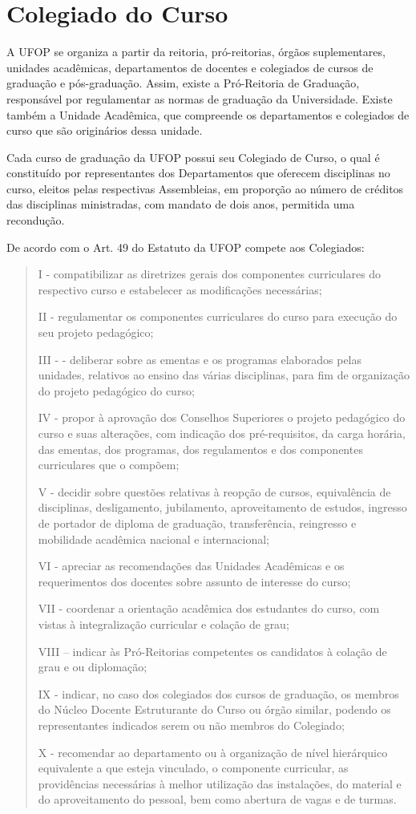 \documentclass[
	12pt,				%
	openright,			%
	oneside,			%
	a4paper,			%
	english,			%
	brazil				%
	]{abntex2}
\begin{document}
\section{Colegiado do Curso}
A UFOP se organiza a partir da reitoria, pró-reitorias, órgãos suplementares, unidades acadêmicas, departamentos de docentes e colegiados de cursos de graduação e pós-graduação. Assim, existe a Pró-Reitoria de Graduação, responsável por regulamentar as normas de graduação da Universidade. Existe também a Unidade Acadêmica, que compreende os departamentos e colegiados de curso que são originários dessa unidade.

Cada curso de graduação da UFOP possui seu Colegiado de Curso, o qual é constituído por representantes dos Departamentos que oferecem disciplinas no curso, eleitos pelas respectivas Assembleias, em proporção ao número de créditos das disciplinas ministradas, com mandato de dois anos, permitida uma recondução.

De acordo com o Art. 49 do Estatuto da UFOP compete aos Colegiados:

\begin{quotation}
I - compatibilizar as diretrizes gerais dos componentes curriculares do respectivo curso e estabelecer as modificações necessárias;

II - regulamentar os componentes curriculares do curso para execução do seu projeto
pedagógico;

III - - deliberar sobre as ementas e os programas elaborados pelas unidades, relativos ao ensino das várias disciplinas, para fim de organização do projeto pedagógico do curso;

IV - propor à aprovação dos Conselhos Superiores o projeto pedagógico do curso e suas
alterações, com indicação dos pré-requisitos, da carga horária, das ementas, dos programas, dos regulamentos e dos componentes curriculares que o compõem;

V - decidir sobre questões relativas à reopção de cursos, equivalência de disciplinas, desligamento, jubilamento, aproveitamento de estudos, ingresso de portador de diploma de graduação, transferência, reingresso e mobilidade acadêmica nacional e internacional;

VI - apreciar as recomendações das Unidades Acadêmicas e os requerimentos dos
docentes sobre assunto de interesse do curso;

VII - coordenar a orientação acadêmica dos estudantes do curso, com vistas à
integralização curricular e colação de grau;

VIII – indicar às Pró-Reitorias competentes os candidatos à colação de grau e ou
diplomação;

IX - indicar, no caso dos colegiados dos cursos de graduação, os membros do Núcleo
Docente Estruturante do Curso ou órgão similar, podendo os representantes indicados serem ou não membros do Colegiado;

X - recomendar ao departamento ou à organização de nível hierárquico equivalente a que esteja vinculado, o componente curricular, as providências necessárias à melhor utilização das instalações, do material e do aproveitamento do pessoal, bem como abertura de vagas e de turmas.
\end{quotation}
\end{document}
